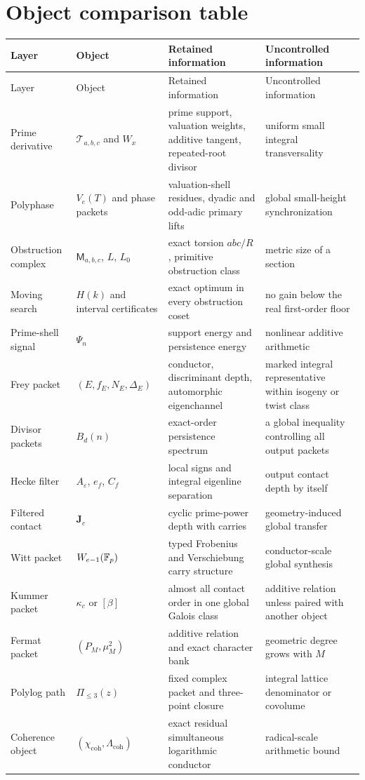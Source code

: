 \section{Object comparison table}
\begingroup\footnotesize\setlength{\tabcolsep}{3pt}
\begin{longtable}{L{0.14\textwidth}L{0.21\textwidth}L{0.27\textwidth}L{0.27\textwidth}}
\toprule
Layer & Object & Retained information & Uncontrolled information\\
\midrule
\endfirsthead
\toprule
Layer & Object & Retained information & Uncontrolled information\\
\midrule
\endhead
Prime derivative & $\mathcal T_{a,b,c}$ and $W_x$ & prime support, valuation weights, additive tangent, repeated-root divisor & uniform small integral transversality\\
Polyphase & $V_e(T)$ and phase packets & valuation-shell residues, dyadic and odd-adic primary lifts & global small-height synchronization\\
Obstruction complex & $\mathsf M_{a,b,c}$, $L$, $L_0$ & exact torsion $abc/R$, primitive obstruction class & metric size of a section\\
Moving search & $H(k)$ and interval certificates & exact optimum in every obstruction coset & no gain below the real first-order floor\\
Prime-shell signal & $\Psi_n$ & support energy and persistence energy & nonlinear additive arithmetic\\
Frey packet & $(E,f_E,N_E,\Delta_E)$ & conductor, discriminant depth, automorphic eigenchannel & marked integral representative within isogeny or twist class\\
Divisor packets & $B_d(n)$ & exact-order persistence spectrum & a global inequality controlling all output packets\\
Hecke filter & $A_\varepsilon$, $e_f$, $C_f$ & local signs and integral eigenline separation & output contact depth by itself\\
Filtered contact & $\mathbf J_c$ & cyclic prime-power depth with carries & geometry-induced global transfer\\
Witt packet & $W_{e-1}(\mathbb F_p)$ & typed Frobenius and Verschiebung carry structure & conductor-scale global synthesis\\
Kummer packet & $\kappa_c$ or $[\beta]$ & almost all contact order in one global Galois class & additive relation unless paired with another object\\
Fermat packet & $(P_M,\mu_M^2)$ & additive relation and exact character bank & geometric degree grows with $M$\\
Polylog path & $\Pi_{\le3}(z)$ & fixed complex packet and three-point closure & integral lattice denominator or covolume\\
Coherence object & $(\chi_{\mathrm{coh}},\Lambda_{\mathrm{coh}})$ & exact residual simultaneous logarithmic conductor & radical-scale arithmetic bound\\
\bottomrule
\end{longtable}
\endgroup

